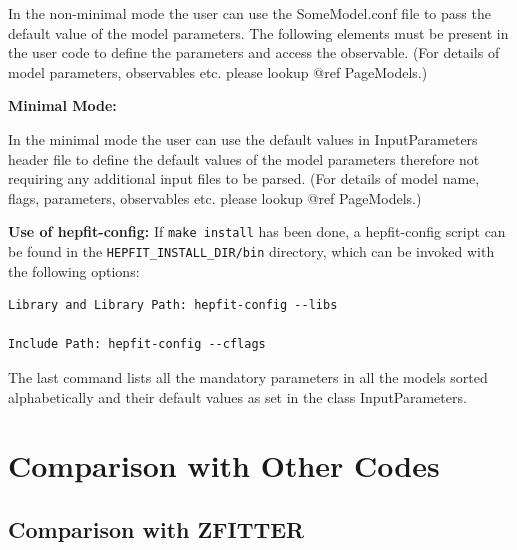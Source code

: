 \documentclass[preprint,3p,12pt]{elsarticle}
\begin{document}
In the non-minimal mode the user can use the SomeModel.conf file to pass the default value of
the model parameters. The following elements must be present in the user code to define
the parameters and access the observable. (For details of model parameters, observables etc. please lookup @ref PageModels.)


%
{\bf Minimal Mode:}

In the minimal mode the user can use the default values in InputParameters header file to define the
default values of the model parameters therefore not requiring any additional input files to be
parsed. (For details of model name, flags, parameters, observables etc. please lookup @ref PageModels.)


%
{\bf Use of hepfit-config:} If \texttt{make install} has been done, a hepfit-config script can be found in the
\texttt{HEPFIT\_INSTALL\_DIR/bin} directory, which can be invoked with the 
following options:

\begin{lstlisting}
Library and Library Path: hepfit-config --libs

Include Path: hepfit-config --cflags
\end{lstlisting}

The last command lists all the mandatory parameters in all the models sorted alphabetically and their
default values as set in the class InputParameters.
\section{Comparison with Other Codes}
\label{sec:Comparison}

\subsection{Comparison with ZFITTER}
\label{sec:ZFitter}
\end{document}
